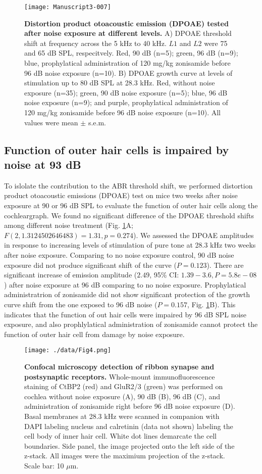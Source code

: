 \documentclass[11pt]{article}
\begin{document}
\begin{figure}[ht!]
\centering
\texttt{[image: Manuscript3-007]}
\caption{{\bf {Distortion product otoacoustic emission (DPOAE) tested after noise exposure at different levels.}} A) DPOAE threshold shift at frequency across the 5 kHz to 40 kHz. $L1$ and $L2$ were 75 and 65 dB SPL, respecitvely. Red, 90 dB (n=5); green, 96 dB (n=9); blue, prophylatical administration of 120 mg/kg zonisamide before 96 dB noise exposure (n=10). B) DPOAE growth curve at levels of stimulation up to 80 dB SPL at 28.3 kHz. Red, without noise exposure (n=35); green, 90 dB noise exposure (n=5); blue, 96 dB noise exposure (n=9); and purple, prophylatical administration of 120 mg/kg zonisamide before 96 dB noise exposure (n=10). All values were  mean $\pm$ s.e.m. }
\label{fig:Figure3}
\end{figure}

\subsection {Function of outer hair cells is impaired by noise at 93 dB}
To islolate the contribution to the ABR threshold shift, we performed distortion product otoacoustic emissions (DPOAE) test on mice two weeks after noise exposure at 90 or 96 dB SPL to evaluate the function of outer hair cells along the cochleargraph. We found no significant difference of the DPOAE threshold shifts among different noise treatment 
(Fig. \ref{fig:Figure3}A; $F(2,1.3124502646483)=1.31,
 p=0.274$). We assessed the DPOAE amplitudes in response to increasing levels of stimulation of pure tone at 28.3 kHz two weeks after noise exposure. Comparing to no noise exposure control, 90 dB noise exposure did not produce significant shift of the curve 
($P=0.123$). There are significant increase of emission amplitude ($2.49$, 95\% CI: $1.39 - 3.6, P= 5.8e-08$) after noise exposure at 96 dB comparing to no noise exposure. Prophylatical administratrion of zonisamide did not show significant protection of the growth curve shift from the one exposed to 96 dB noise ($P=0.157$, Fig. \ref{fig:Figure3}B).  
 This indicates that the function of out hair cells were impaired by 96 dB SPL noise exposure, and also prophlylatical administration of zonisamide cannot protect the function of outer hair cell from damage by noise exposure.

\begin{figure}[ht!]
\centering
\texttt{[image: ./data/Fig4.png]}
\caption{{\bf {Confocal microscopy detection of ribbon synapse and postsynaptic receptors.}}  Whole-mount immunofluorescence staining of CtBP2 (red) and GluR2/3 (green) was performed on cochlea without noise exposure (A), 90 dB (B), 96 dB (C), and administration of zonisamide right before 96 dB noise exposure (D). Basal membranes at 28.3 kHz were scanned in companion with DAPI labeling nucleus and calretinin (data not shown) labeling the cell body of inner hair cell. White dot lines demarcate the cell boundaries. Side panel, the image projected onto the left side of the z-stack. All images were the maximium projection of the z-stack. Scale bar: 10 $\mu$m. }
\label{fig:Figure4}
\end{figure}
\end{document}
